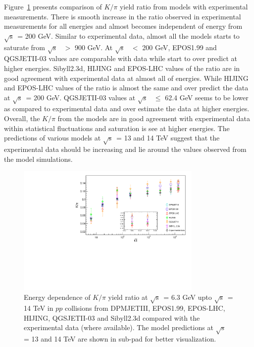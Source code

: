 \documentclass{article}
\newcommand{\sqrts}{\mbox{$\sqrt{\mathrm{s}}$}}
\begin{document}
Figure~\ref{fig3} presents comparison of $K/\pi$ yield ratio from models with experimental measurements. There is smooth increase in the ratio observed in experimental measurements for all energies and almost becomes independent of energy from \sqrts~= 200 GeV. Similar to experimental data, almost all the models starts to saturate from \sqrts~ $>$ 900 GeV. At \sqrts~ $<$ 200 GeV, EPOS1.99 and QGSJETII-03 values are comparable with data while start to over predict at higher energies. Sibyll2.3d, HIJING and EPOS-LHC values of the ratio are in good agreement with experimental data at almost all of energies. While HIJING and EPOS-LHC values of the ratio is almost the same and over predict the data at \sqrts~= 200 GeV. QGSJETII-03 values at \sqrts~ $\le$ 62.4 GeV seems to be lower as compared to experimental data and over estimate the data at higher energies. Overall, the $K/\pi$ from the models are in good agreement with experimental data within statistical fluctuations and saturation is see at higher energies. The predictions of various models at \sqrts~= 13 and 14 TeV suggest that the experimental data should be increasing and lie around the values observed from the model simulations.         





\begin{figure}[ht!]
\begin{center}
\includegraphics[width=0.8\textwidth]{new_K_pi.pdf}
\caption{ Energy dependence of $K/\pi$ yield ratio at \sqrts~= 6.3 GeV upto \sqrts~= 14 TeV in $pp$ collisions from DPMJETIII, EPOS1.99, EPOS-LHC, HIJING, QGSJETII-03 and Sibyll2.3d compared with the experimental data (where available). The model predictions at \sqrts~ = 13 and 14 TeV are shown in sub-pad for better visualization.}
\label{fig3}
\end{center}
\end{figure}
\end{document}
